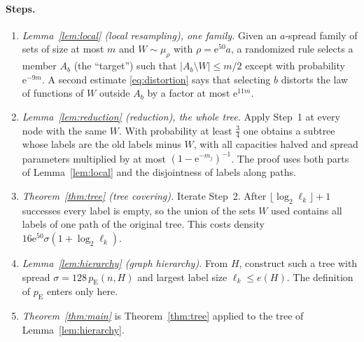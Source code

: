 \documentclass[11pt]{article}
\numberwithin{equation}{section}
\theoremstyle{remark}
\newcommand{\pE}{p_{\mathrm E}}
\newcommand{\ee}{\mathrm e}
\begin{document}
\paragraph{Steps.}
\begin{enumerate}[label=\arabic*.,leftmargin=2em,itemsep=3pt]
 \item \emph{Lemma~\ref{lem:local} (local resampling), one family.}
 Given an $a$-spread family of sets of size at most $m$ and
 $W\sim\mu_\rho$ with $\rho=\ee^{50}a$, a randomized rule selects a
 member $A_b$ (the ``target'') such that $|A_b\setminus W|\le m/2$
 except with probability $\ee^{-9m}$. A second estimate
 \eqref{eq:distortion} says that selecting $b$ distorts the law of
 functions of $W$ outside $A_b$ by a factor at most $\ee^{11m}$.
 \item \emph{Lemma~\ref{lem:reduction} (reduction), the whole tree.}
 Apply Step~1 at every node with the same $W$. With probability at
 least $\frac34$ one obtains a subtree whose labels are the old labels
 minus $W$, with all capacities halved and spread parameters multiplied
 by at most $(1-\ee^{-m_j})^{-1}$. The proof uses both parts of
 Lemma~\ref{lem:local} and the disjointness of labels along paths.
 \item \emph{Theorem~\ref{thm:tree} (tree covering).} Iterate Step~2.
 After $\lfloor\log_2\ell_k\rfloor+1$ successes every label is empty, so
 the union of the sets $W$ used contains all labels of one path of the
 original tree. This costs density
 $16\ee^{50}\sigma(1+\log_2\ell_k)$.
 \item \emph{Lemma~\ref{lem:hierarchy} (graph hierarchy).} From $H$,
 construct such a tree with spread $\sigma=128\,\pE(n,H)$ and largest
 label size $\ell_k\le e(H)$. The definition of $\pE$ enters only here.
 \item \emph{Theorem~\ref{thm:main}} is Theorem~\ref{thm:tree} applied
 to the tree of Lemma~\ref{lem:hierarchy}.
\end{enumerate}

\begin{center}
\end{center}
\end{document}
